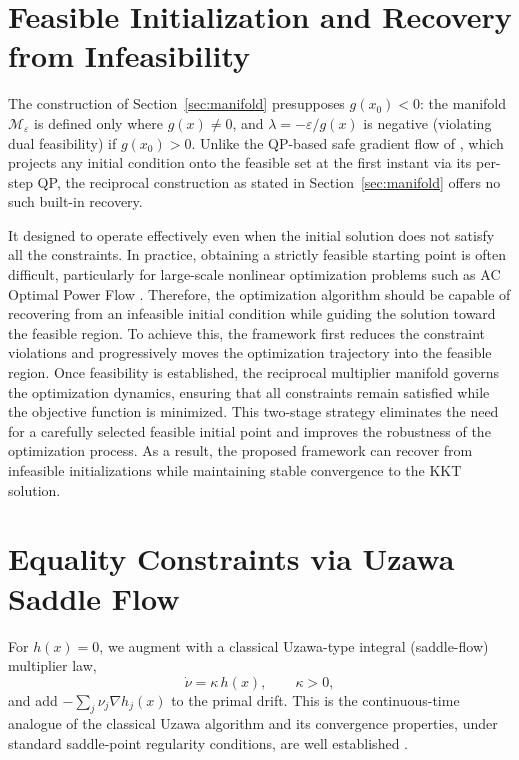 \documentclass[11pt,onecolumn]{article}
\theoremstyle{definition}
\theoremstyle{remark}
\newcommand{\Mveps}{\mathcal{M}_\varepsilon}
\begin{document}
\section{Feasible Initialization and Recovery from Infeasibility} \label{sec:feasinit}

The construction of Section~\ref{sec:manifold} presupposes $g(x_0) < 0$: the manifold $\Mveps$
is defined only where $g(x) \ne 0$, and $\lambda = -\varepsilon/g(x)$ is negative (violating
dual feasibility) if $g(x_0) > 0$. Unlike the QP-based safe gradient flow of
\cite{allibhoy2024}, which projects any initial condition onto the feasible set at the first
instant via its per-step QP, the reciprocal construction as stated in
Section~\ref{sec:manifold} offers no such built-in recovery.

It designed to operate effectively even when the initial solution does not satisfy all the constraints. In practice, obtaining a strictly feasible starting point is often difficult, particularly for large-scale nonlinear optimization problems such as AC Optimal Power Flow . Therefore, the optimization algorithm should be capable of recovering from an infeasible initial condition while guiding the solution toward the feasible region. To achieve this, the framework first reduces the constraint violations and progressively moves the optimization trajectory into the feasible region. Once feasibility is established, the reciprocal multiplier manifold governs the optimization dynamics, ensuring that all constraints remain satisfied while the objective function is minimized. This two-stage strategy eliminates the need for a carefully selected feasible initial point and improves the robustness of the optimization process. As a result, the proposed framework can recover from infeasible initializations while maintaining stable convergence to the KKT solution.


\section{Equality Constraints via Uzawa Saddle Flow} \label{sec:uzawa}

For $h(x) = 0$, we augment with a classical Uzawa-type integral (saddle-flow) multiplier law,
\begin{equation}
\dot\nu = \kappa\, h(x), \qquad \kappa > 0, \label{eq:uzawa}
\end{equation}
and add $-\sum_j \nu_j \nabla h_j(x)$ to the primal drift. This is the continuous-time analogue
of the classical Uzawa algorithm and its convergence properties, under standard saddle-point
regularity conditions, are well established \cite{arrow1958,feijer2010}.
\end{document}
